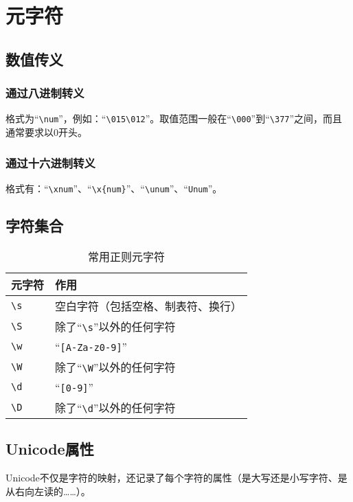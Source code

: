 \chapter{元字符}

\section{数值传义}

\subsection{通过八进制转义}

格式为“\verb|\num|”，例如：“\verb|\015\012|”。取值范围一般在“\verb|\000|”到“\verb|\377|”之间，而且通常要求以0开头。

\subsection{通过十六进制转义}

格式有：“\verb|\xnum|”、“\verb|\x{num}|”、“\verb|\unum|”、“\verb|Unum|”。

\section{字符集合}

\begin{table}[htbp]
	\caption{常用正则元字符}
	\label{tab:part.meta.charset}
	\centering
	\begin{tabular}{ll}
		\hline
		元字符 & 作用 \\
		\hline
		\verb|\s| & 空白字符（包括空格、制表符、换行）\\
		\verb|\S| & 除了“\verb|\s|”以外的任何字符\\
		\verb|\w| & “\verb|[A-Za-z0-9]|”\\
		\verb|\W| & 除了“\verb|\W|”以外的任何字符\\
		\verb|\d| & “\verb|[0-9]|”\\
		\verb|\D| & 除了“\verb|\d|”以外的任何字符\\
		\hline
	\end{tabular}
\end{table}

\section{Unicode属性}

Unicode不仅是字符的映射，还记录了每个字符的属性（是大写还是小写字符、是从右向左读的……）。

